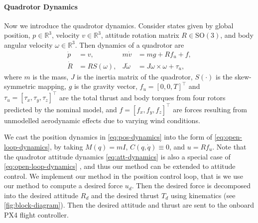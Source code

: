\paragraph{Quadrotor Dynamics}
Now we introduce the quadrotor dynamics. Consider states given by global position, $p \in \mathbb{R}^3$, velocity $v \in \mathbb{R}^3$, attitude rotation matrix $R \in \mathrm{SO}(3)$, and body angular velocity $\omega \in \mathbb{R}^3$. Then dynamics of a quadrotor are
\begin{subequations}
\begin{align}
\dot{p} &= v, &  
m\dot{v} &= mg + Rf_u + f,\label{eq:pos-dynamics} \\ 
\dot{R}&=RS(\omega), & 
J\dot{\omega} &= J \omega \times \omega  + \tau_u,
\label{eq:att-dynamics}
\end{align}
\label{eq:quadrotor-dynamics}
\end{subequations}
where $m$ is the mass, $J$ is the inertia matrix of the quadrotor, $S(\cdot)$ is the skew-symmetric mapping, $g$ is the gravity vector, $f_u = [0, 0, T]^\top$ and $\tau_u = [\tau_x, \tau_y, \tau_z]^\top$ are the total thrust and body torques from four rotors predicted by the nominal model, and $f = [f_x, f_y, f_z]^\top$ are forces resulting from unmodelled aerodynamic effects due to varying wind conditions.

We cast the position dynamics in \cref{eq:pos-dynamics} into the form of \cref{eq:open-loop-dynamics}, by taking $M(q) = m I$, $C(q, \dot q) \equiv 0$, and $u = R f_u$. Note that the quadrotor attitude dynamics \cref{eq:att-dynamics} is also a special case of \cref{eq:open-loop-dynamics} \cite{slotine1991applied,murray_mathematical_2017}, and thus our method can be extended to attitude control. We implement our method in the position control loop, that is we use our method to compute a desired force $u_d$.  Then the desired force is decomposed into the desired attitude $R_d$ and the desired thrust $T_d$ using kinematics (see \cref{fig:block-diagram}). Then the desired attitude and thrust are sent to the onboard PX4 flight controller.

